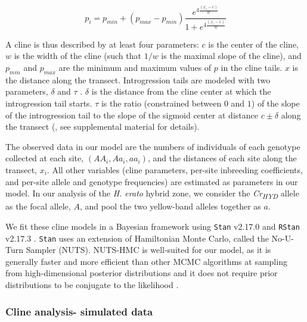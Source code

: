 \documentclass[]{article}
\begin{document}
\begin{equation}
\label{eq:clineEq}
p_{i} = p_{min} + (p_{max} - p_{min})\frac{e^{4\frac{(x_{i}-c)}{w}}}{1 + e^{4\frac{(x_{i}-c)}{w}}}
\end{equation}

A cline is thus described by at least four parameters: \(c\) is the
center of the cline, \(w\) is the width of the cline (such that \(1/w\)
is the maximal slope of the cline), and \(p_{min}\) and \(p_{max}\) are
the minimum and maximum values of \(p\) in the cline tails. \(x\) is the
distance along the transect. Introgression tails are modeled with two
parameters, \(\delta\) and \(\tau\) \citep{Gay:2008jp}. \(\delta\) is
the distance from the cline center at which the introgression tail
starts. \(\tau\) is the ratio (constrained between \(0\) and \(1\)) of
the slope of the introgression tail to the slope of the sigmoid center
at distance \(c \pm \delta\) along the transect (\citealt{Gay:2008jp},
see supplemental material for details).

The observed data in our model are the numbers of individuals of each
genotype collected at each site, \((AA_{i}, Aa_{i}, aa_{i})\), and the
distances of each site along the transect, \(x_{i}\). All other
variables (cline parameters, per-site inbreeding coefficients, and
per-site allele and genotype frequencies) are estimated as parameters in
our model. In our analysis of the \textit{H. erato} hybrid zone, we
consider the \textit{Cr\textsubscript{HYD}} allele as the focal allele,
\(A\), and pool the two yellow-band alleles together as \(a\).

We fit these cline models in a Bayesian framework using \texttt{Stan}
v2.17.0 and \texttt{RStan} v2.17.3
\citep{Carpenter:2017ke, Anonymous:tt}. \texttt{Stan} uses an extension
of Hamiltonian Monte Carlo, called the No-U-Turn Sampler (NUTS).
NUTS-HMC is well-suited for our model, as it is generally faster and
more efficient than other MCMC algorithms at sampling from
high-dimensional posterior distributions and it does not require prior
distributions to be conjugate to the likelihood
\citep{Hoffman:2011wm, Betancourt:2018vd}.

\subsubsection{Cline analysis- simulated
data}\label{cline-analysis--simulated-data}
\end{document}
